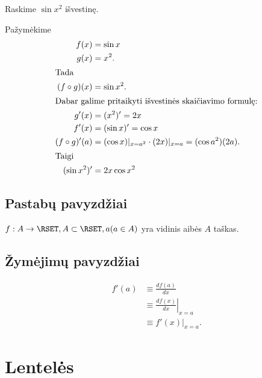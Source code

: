 \begin{exmp}
  Raskime $\sin x^{2}$ išvestinę.

  Pažymėkime
  \begin{align*}
    f(x) &= \sin x \\
    g(x) &= x^{2}. \\
    \intertext{Tada}
    (f \circ g)(x) &= \sin x^{2}.\\
    \intertext{Dabar galime pritaikyti išvestinės skaičiavimo formulę:}
    g'(x) &= (x^{2})' = 2x \\
    f'(x) &= (\sin x)' = \cos x \\
    (f \circ g)'(a) &= (\cos x)|_{x = a^{2}} \cdot (2x)|_{x=a}
      = (\cos a^2)(2a). \\
    \intertext{Taigi}
    (\sin x^{2})' &= 2x \cos x^{2}
  \end{align*}

\end{exmp}

\subsection{Pastabų pavyzdžiai}

\begin{note}
  $f : A \to \RSET, A \subset \RSET, a(a \in A)$ yra vidinis aibės
  $A$ taškas.
\end{note}

\subsection{Žymėjimų pavyzdžiai}

\begin{notation}
  \begin{align*}
    f'(a)
    &\equiv \frac{d f(a)}{dx} \\
    &\equiv \left. \frac{d f(x)}{dx} \right|_{x = a} \\
    &\equiv \left. f'(x) \right|_{x = a}.
  \end{align*}
\end{notation}

\section{Lentelės}


